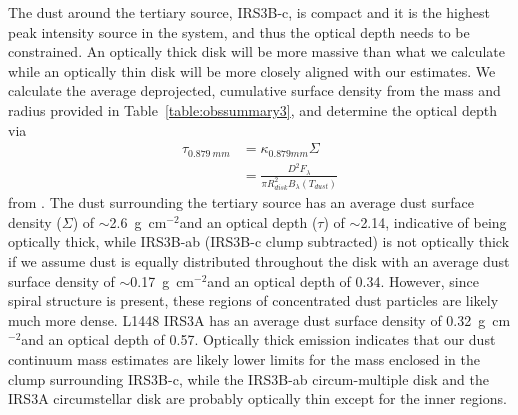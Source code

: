 \documentclass[twocolumn, 12pt]{aastex63}
\newcommand{\ab}{$\sim$}
\begin{document}
The dust around the tertiary source, IRS3B-c, is compact and it is the highest peak intensity source in the system, and thus the optical depth needs to be constrained. An optically thick disk will be more massive than what we calculate while an optically thin disk will be more closely aligned with our estimates. We calculate the average deprojected, cumulative surface density from the mass and radius provided in Table~\ref{table:obssummary3}, and determine the optical depth via 
\begin{align*}
\tau_{0.879~mm} &= \kappa_{0.879 mm}\Sigma \\
 &=\frac{D^2 F_{\lambda}}{\pi R_{disk}^{2}B_{\lambda}(T_{dust})}
\end{align*}
from \citep{2016Natur.538..483T}. The dust surrounding the tertiary source has an average dust surface density ($\Sigma$) of \ab2.6~g~cm$^{-2}$\space and an optical depth ($\tau$) of \ab2.14, indicative of being optically thick, while IRS3B-ab (IRS3B-c clump subtracted) is not optically thick if we assume dust is equally distributed throughout the disk with an average dust surface density of \ab0.17~g~cm$^{-2}$\space and an optical depth of 0.34. However, since spiral structure is present, these regions of concentrated dust particles are likely much more dense. L1448 IRS3A has an average dust surface density of 0.32~g~cm$^{-2}$\space and an optical depth of 0.57. Optically thick emission indicates that our dust continuum mass estimates are likely lower limits for the mass enclosed in the clump surrounding IRS3B-c, while the IRS3B-ab circum-multiple disk and the IRS3A circumstellar disk are probably optically thin except for the inner regions. 
\end{document}
